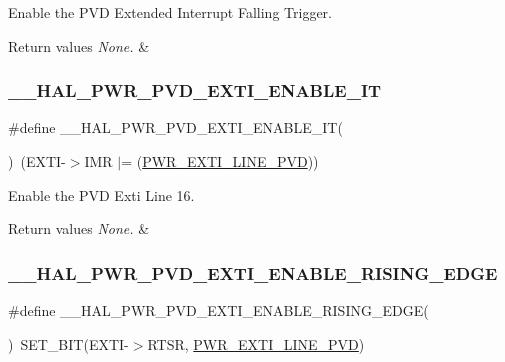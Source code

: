 Enable the P\+VD Extended Interrupt Falling Trigger. 


\begin{DoxyRetVals}{Return values}
{\em None.} & \\
\hline
\end{DoxyRetVals}
\mbox{\label{group___p_w_r___exported___macro_ga3180f039cf14ef78a64089f387f8f9c2}} 
\subsubsection{\texorpdfstring{\_\_HAL\_PWR\_PVD\_EXTI\_ENABLE\_IT}{\_\_HAL\_PWR\_PVD\_EXTI\_ENABLE\_IT}}
{\footnotesize\ttfamily \#define \+\_\+\+\_\+\+H\+A\+L\+\_\+\+P\+W\+R\+\_\+\+P\+V\+D\+\_\+\+E\+X\+T\+I\+\_\+\+E\+N\+A\+B\+L\+E\+\_\+\+IT(\begin{DoxyParamCaption}{ }\end{DoxyParamCaption})~(E\+X\+TI-\/$>$I\+MR $\vert$= (\mbox{\hyperlink{group___p_w_r___p_v_d___e_x_t_i___line_ga43a49255649e03d2d2b6b12c5c379d2b}{P\+W\+R\+\_\+\+E\+X\+T\+I\+\_\+\+L\+I\+N\+E\+\_\+\+P\+VD}}))}



Enable the P\+VD Exti Line 16. 


\begin{DoxyRetVals}{Return values}
{\em None.} & \\
\hline
\end{DoxyRetVals}
\mbox{\label{group___p_w_r___exported___macro_ga7bef3f30c9fe267c99d5240fbf3f878c}} 
\subsubsection{\texorpdfstring{\_\_HAL\_PWR\_PVD\_EXTI\_ENABLE\_RISING\_EDGE}{\_\_HAL\_PWR\_PVD\_EXTI\_ENABLE\_RISING\_EDGE}}
{\footnotesize\ttfamily \#define \+\_\+\+\_\+\+H\+A\+L\+\_\+\+P\+W\+R\+\_\+\+P\+V\+D\+\_\+\+E\+X\+T\+I\+\_\+\+E\+N\+A\+B\+L\+E\+\_\+\+R\+I\+S\+I\+N\+G\+\_\+\+E\+D\+GE(\begin{DoxyParamCaption}{ }\end{DoxyParamCaption})~S\+E\+T\+\_\+\+B\+IT(E\+X\+TI-\/$>$R\+T\+SR, \mbox{\hyperlink{group___p_w_r___p_v_d___e_x_t_i___line_ga43a49255649e03d2d2b6b12c5c379d2b}{P\+W\+R\+\_\+\+E\+X\+T\+I\+\_\+\+L\+I\+N\+E\+\_\+\+P\+VD}})}



